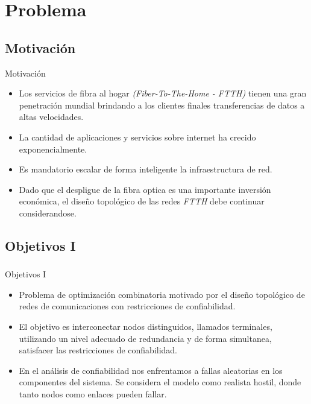 \section{Problema}
\subsection{Motivación}
\begin{frame}%
    \begin{block}{Motivación}
    \begin{itemize} 
    	\item Los servicios de fibra al hogar \emph{(Fiber-To-The-Home - FTTH)} tienen una gran penetración mundial brindando a los clientes finales transferencias de datos a altas velocidades.
    	\item La cantidad de aplicaciones y servicios sobre internet ha crecido exponencialmente.
    	\item Es mandatorio escalar de forma inteligente la infraestructura de red.
    	\item Dado que el despligue de la fibra optica es una importante inversión económica, el diseño topológico de las redes \emph{FTTH} debe continuar considerandose.
	\end{itemize} 
    \end{block}
\end{frame}

\subsection{Objetivos I}
\begin{frame}
	\frametitle{}
    \begin{block}{Objetivos I}
	\begin{itemize} 
    	\item Problema de optimización combinatoria motivado por el diseño topológico de redes de comunicaciones 
con restricciones de confiabilidad.
		\item El objetivo es interconectar nodos distinguidos, llamados terminales, utilizando un nivel adecuado de redundancia y de forma simultanea, satisfacer las restricciones de confiabilidad.
	\item En el análisis de confiabilidad nos enfrentamos a fallas aleatorias en los componentes del sistema. Se considera el modelo como realista hostil, donde tanto nodos como enlaces pueden fallar.
	\end{itemize} 
    \end{block}
\end{frame}

